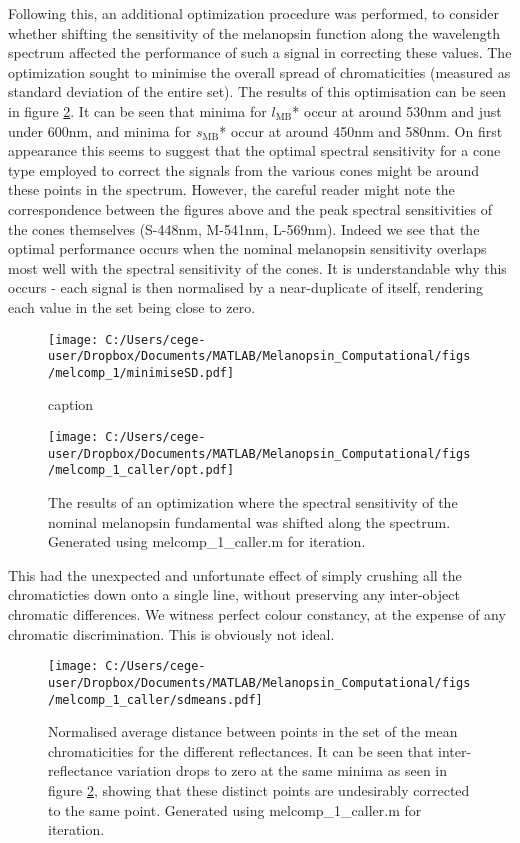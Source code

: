 \documentclass{article}
\begin{document}
Following this, an additional optimization procedure was performed, to consider whether shifting the sensitivity of the melanopsin function along the wavelength spectrum affected the performance of such a signal in correcting these values. The optimization sought to minimise the overall spread of chromaticities (measured as standard deviation of the entire set). The results of this optimisation can be seen in figure \ref{fig:opt}. It can be seen that minima for $l_{\text{MB}}$* occur at around 530nm and just under 600nm, and minima for $s_{\text{MB}}$* occur at around 450nm and 580nm. On first appearance this seems to suggest that the optimal spectral sensitivity for a cone type employed to correct the signals from the various cones might be around these points in the spectrum. However, the careful reader might note the correspondence between the figures above and the peak spectral sensitivities of the cones themselves (S-448nm, M-541nm, L-569nm). Indeed we see that the optimal performance occurs when the nominal melanopsin sensitivity overlaps most well with the spectral sensitivity of the cones. It is understandable why this occurs - each signal is then normalised by a near-duplicate of itself, rendering each value in the set being close to zero.

\begin{figure}[ht]
    \centering
    \texttt{[image: C:/Users/cege-user/Dropbox/Documents/MATLAB/Melanopsin\_Computational/figs/melcomp\_1/minimiseSD.pdf]}
    \caption{caption}
    \label{fig:opt}
\end{figure} 

\begin{figure}[ht]
    \centering
    \texttt{[image: C:/Users/cege-user/Dropbox/Documents/MATLAB/Melanopsin\_Computational/figs/melcomp\_1\_caller/opt.pdf]}
    \caption{The results of an optimization where the spectral sensitivity of the nominal melanopsin fundamental was shifted along the spectrum. Generated using melcomp\_1\_caller.m for iteration.}
    \label{fig:opt}
\end{figure} 

This had the unexpected and unfortunate effect of simply crushing all the chromaticties down onto a single line, without preserving any inter-object chromatic differences. We witness perfect colour constancy, at the expense of any chromatic discrimination. This is obviously not ideal.

\begin{figure}[ht]
    \centering
    \texttt{[image: C:/Users/cege-user/Dropbox/Documents/MATLAB/Melanopsin\_Computational/figs/melcomp\_1\_caller/sdmeans.pdf]}
    \caption{Normalised average distance between points in the set of the mean chromaticities for the different reflectances. It can be seen that inter-reflectance variation drops to zero at the same minima as seen in figure \ref{fig:opt}, showing that these distinct points are undesirably corrected to the same point. Generated using melcomp\_1\_caller.m for iteration.}
    \label{fig:sdmeans}
\end{figure} 
\end{document}
